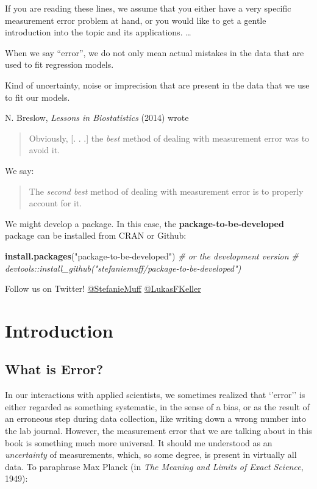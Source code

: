 \documentclass[]{book}
\newenvironment{Shaded}{\begin{snugshade}}{\end{snugshade}}
\newcommand{\KeywordTok}[1]{\textcolor[rgb]{0.13,0.29,0.53}{\textbf{#1}}}
\newcommand{\StringTok}[1]{\textcolor[rgb]{0.31,0.60,0.02}{#1}}
\newcommand{\CommentTok}[1]{\textcolor[rgb]{0.56,0.35,0.01}{\textit{#1}}}
\newcommand{\NormalTok}[1]{#1}
\theoremstyle{definition}
\theoremstyle{definition}
\theoremstyle{definition}
\theoremstyle{remark}
\begin{document}
If you are reading these lines, we assume that you either have a very
specific measurement error problem at hand, or you would like to get a
gentle introduction into the topic and its applications. \ldots{}

When we say ``error'', we do not only mean actual mistakes in the data
that are used to fit regression models.

Kind of uncertainty, noise or imprecision that are present in the data
that we use to fit our models.

N. Breslow, \emph{Lessons in Biostatistics} (2014) \citep{breslow2014}
wrote

\begin{quote}
Obviously, {[}. . .{]} the \emph{best} method of dealing with
measurement error was to avoid it.
\end{quote}

We say:

\begin{quote}
The \emph{second best} method of dealing with measurement error is to
properly account for it.
\end{quote}

We might develop a package. In this case, the
\textbf{package-to-be-developed} package can be installed from CRAN or
Github:

\begin{Shaded}
\begin{Highlighting}[]
\KeywordTok{install.packages}\NormalTok{(}\StringTok{"package-to-be-developed"}\NormalTok{)}
\CommentTok{# or the development version}
\CommentTok{# devtools::install_github("stefaniemuff/package-to-be-developed")}
\end{Highlighting}
\end{Shaded}

Follow us on Twitter!
\href{https://twitter.com/stefaniemuff}{@StefanieMuff}
\href{https://twitter.com/lukasfkeller}{@LukasFKeller}

\chapter{Introduction}\label{intro}

\section{What is Error?}\label{what-is-error}

In our interactions with applied scientists, we sometimes realized that
`'error'' is either regarded as something systematic, in the sense of a
bias, or as the result of an erroneous step during data collection, like
writing down a wrong number into the lab journal. However, the
measurement error that we are talking about in this book is something
much more universal. It should me understood as an \emph{uncertainty} of
measurements, which, so some degree, is present in virtually all data.
To paraphrase Max Planck (in \emph{The Meaning and Limits of Exact
Science}, 1949):
\end{document}

